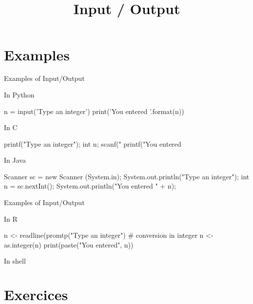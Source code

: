 \documentclass{beamer}
\title{Input / Output}
\begin{document}
\frame{
  \titlepage
}

\section{Examples}

\begin{frame}[fragile]{Examples of Input/Output}

  \begin{code}{In Python}
    \begin{Python}
n = input('Type an integer\n')
print('You entered {}\n'.format(n))
    \end{Python}
  \end{code}

  \begin{code}{In C}
    \begin{C}
printf("Type an integer\n");
int n;
scanf("%
printf("You entered %
    \end{C}
  \end{code}

  \begin{code}{In Java}
    \begin{Java}
Scanner sc = new Scanner (System.in);
System.out.println("Type an integer");
int n = sc.nextInt();
System.out.println("You entered " + n);
    \end{Java}
  \end{code}

\end{frame}

\begin{frame}[fragile]{Examples of Input/Output}

  \begin{code}{In R}
    \begin{R}
n <- readline(promtp("Type an integer")
# conversion in integer
n <- as.integer(n)
print(paste("You entered", n))
    \end{R}
  \end{code}

  \begin{code}{In shell}
  \end{code}

\end{frame}


\section{Exercices}
\end{document}
